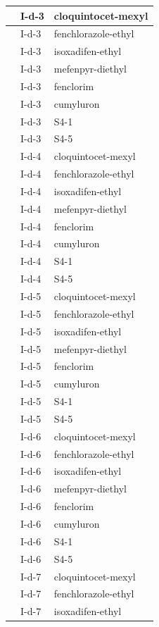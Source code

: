 \documentclass[11pt,a4paper]{article}
\begin{document}
\begin{table}[h]
\begin{tabular}{|l|l|l|}
 & I-d-3 & cloquintocet-mexyl \\ \hline
 & I-d-3 & fenchlorazole-ethyl \\ \hline
 & I-d-3 & isoxadifen-ethyl \\ \hline
 & I-d-3 & mefenpyr-diethyl \\ \hline
 & I-d-3 & fenclorim \\ \hline
 & I-d-3 & cumyluron \\ \hline
 & I-d-3 & S4-1 \\ \hline
 & I-d-3 & S4-5 \\ \hline
 & I-d-4 & cloquintocet-mexyl \\ \hline
 & I-d-4 & fenchlorazole-ethyl \\ \hline
 & I-d-4 & isoxadifen-ethyl \\ \hline
 & I-d-4 & mefenpyr-diethyl \\ \hline
 & I-d-4 & fenclorim \\ \hline
 & I-d-4 & cumyluron \\ \hline
 & I-d-4 & S4-1 \\ \hline
 & I-d-4 & S4-5 \\ \hline
 & I-d-5 & cloquintocet-mexyl \\ \hline
 & I-d-5 & fenchlorazole-ethyl \\ \hline
 & I-d-5 & isoxadifen-ethyl \\ \hline
 & I-d-5 & mefenpyr-diethyl \\ \hline
 & I-d-5 & fenclorim \\ \hline
 & I-d-5 & cumyluron \\ \hline
 & I-d-5 & S4-1 \\ \hline
 & I-d-5 & S4-5 \\ \hline
 & I-d-6 & cloquintocet-mexyl \\ \hline
 & I-d-6 & fenchlorazole-ethyl \\ \hline
 & I-d-6 & isoxadifen-ethyl \\ \hline
 & I-d-6 & mefenpyr-diethyl \\ \hline
 & I-d-6 & fenclorim \\ \hline
 & I-d-6 & cumyluron \\ \hline
 & I-d-6 & S4-1 \\ \hline
 & I-d-6 & S4-5 \\ \hline
 & I-d-7 & cloquintocet-mexyl \\ \hline
 & I-d-7 & fenchlorazole-ethyl \\ \hline
 & I-d-7 & isoxadifen-ethyl \\ \hline

\end{tabular}
\end{table}
\end{document}
